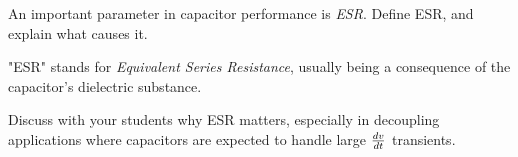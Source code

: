

An important parameter in capacitor performance is {\it ESR}.  Define ESR, and explain what causes it.







"ESR" stands for {\it Equivalent Series Resistance}, usually being a consequence of the capacitor's dielectric substance.







Discuss with your students why ESR matters, especially in decoupling applications where capacitors are expected to handle large ${dv \over dt}$ transients.




